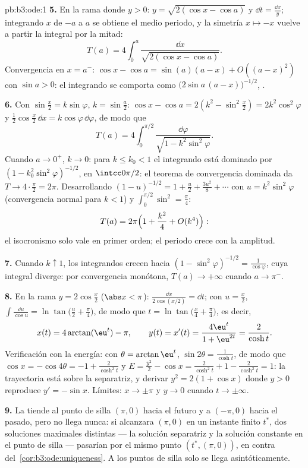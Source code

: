 \begin{solution}{pb:b3:ode:1}
\textbf{5.} En la rama donde $y > 0$: $y = \sqrt{2(\cos x
- \cos a)}$ y $\dd t = \frac{\dd x}{y}$; integrando $x$ de $-a$ a $a$ se
obtiene el medio periodo, y la simetría $x
\mapsto -x$ vuelve a partir la integral por la mitad:
\[
T(a) = 4\int_0^a\frac{\dd x}{\sqrt{2(\cos x - \cos a)}} .
\]
Convergencia en $x = a^-$: $\cos x - \cos a = \sin(a)(a - x) +
O((a-x)^2)$ con $\sin a > 0$: el integrando se comporta como
$\bigl(2\sin a\,(a - x)\bigr)^{-1/2}$,
.

\textbf{6.} Con $\sin\frac x2 = k\sin\varphi$, $k =
\sin\frac a2$: $\cos x - \cos a = 2(k^2 - \sin^2\frac x2)
= 2k^2\cos^2\varphi$ y $\frac12\cos\frac x2\,\dd x =
k\cos\varphi\,\dd\varphi$, de modo que
\[
T(a) = 4\int_0^{\pi/2}
\frac{\dd\varphi}{\sqrt{1 - k^2\sin^2\varphi}} .
\]
Cuando $a \to 0^+$, $k \to 0$: para $k \leq k_0 < 1$ el integrando está
dominado por $(1 - k_0^2\sin^2\varphi)^{-1/2}$,
 en $\intcc0{\pi/2}$: el
teorema de convergencia dominada da $T \to
4\cdot\frac\pi2 = 2\pi$. Desarrollando $(1 - u)^{-1/2} = 1 +
\frac u2 + \frac{3u^2}8 + \cdots$ con $u =
k^2\sin^2\varphi$ (convergencia normal para $k < 1$) y
$\int_0^{\pi/2}\sin^2 = \frac\pi4$:
\[
T(a) = 2\pi\Bigl(1 + \frac{k^2}{4} + O(k^4)\Bigr) :
\]
el isocronismo solo vale en primer orden; el periodo crece con la
amplitud.

\textbf{7.} Cuando $k \uparrow 1$, los integrandos crecen hacia $(1
- \sin^2\varphi)^{-1/2} = \frac1{\cos\varphi}$, cuya integral diverge:
por convergencia monótona, $T(a) \to
+\infty$ cuando $a \to \pi^-$.

\textbf{8.} En la rama $y = 2\cos\frac x2$ ($\abs x <
\pi$): $\frac{\dd x}{2\cos(x/2)} = \dd t$; con $u = \frac
x2$, $\int\frac{\dd u}{\cos u} =
\ln\tan\bigl(\frac u2 + \frac\pi4\bigr)$, de modo que $t =
\ln\tan\bigl(\frac x4 + \frac\pi4\bigr)$, es decir,
\[
x(t) = 4\arctan(\eu^t) - \pi,
\qquad y(t) = x'(t) = \frac{4\eu^t}{1 + \eu^{2t}} =
\frac{2}{\cosh t} .
\]
Verificación con la energía: con $\theta = \arctan\eu^t$,
$\sin2\theta = \frac1{\cosh t}$, de modo que $\cos x = -\cos4\theta =
-1 + \frac{2}{\cosh^2t}$ y $E = \frac{y^2}2 - \cos x =
\frac2{\cosh^2t} + 1 - \frac2{\cosh^2t} = 1$: la trayectoria está sobre
la separatriz, y derivar $y^2 = 2(1 +
\cos x)$ donde $y > 0$ reproduce $y' = -\sin x$. Límites: $x
\to \pm\pi$ y $y \to 0$ cuando $t \to \pm\infty$.

\textbf{9.} La  tiende al punto de
silla $(\pi, 0)$ hacia el futuro y a $(-\pi, 0)$ hacia el pasado, pero
no llega nunca: si alcanzara $(\pi, 0)$ en un instante finito $t^*$, dos
soluciones maximales distintas --- la
solución separatriz y la solución constante en el punto de silla ---
pasarían por el mismo punto $(t^*, (\pi, 0))$, en contra
del~\cref{cor:b3:ode:uniqueness}. A los puntos de silla solo se llega
asintóticamente.


\end{solution}
